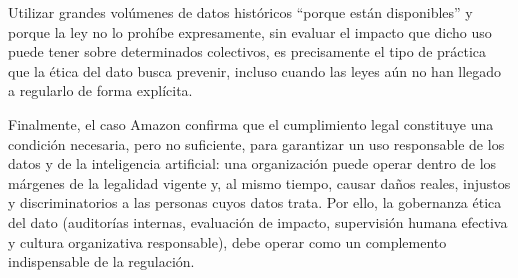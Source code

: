 Utilizar grandes volúmenes de datos históricos ``porque están disponibles'' y porque la ley no lo prohíbe expresamente, sin evaluar el impacto que dicho uso puede tener sobre determinados colectivos, es precisamente el tipo de práctica que la ética del dato busca prevenir, incluso cuando las leyes aún no han llegado a regularlo de forma explícita.

Finalmente, el caso Amazon confirma que el cumplimiento legal constituye una condición necesaria, pero no suficiente, para garantizar un uso responsable de los datos y de la inteligencia artificial: una organización puede operar dentro de los márgenes de la legalidad vigente y, al mismo tiempo, causar daños reales, injustos y discriminatorios a las personas cuyos datos trata. Por ello, la gobernanza ética del dato (auditorías internas, evaluación de impacto, supervisión humana efectiva y cultura organizativa responsable), debe operar como un complemento indispensable de la regulación.
